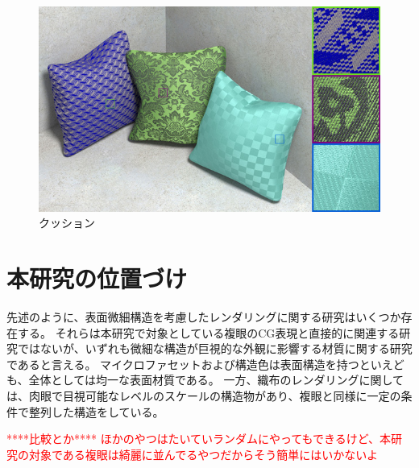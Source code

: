 \begin{figure}[htbp]
  \centering
  \includegraphics[width=5.5in]{./img/cussions.jpg}
  \caption{クッション}
  \label{F}
\end{figure}

\section{本研究の位置づけ}
\label{SPosition}

先述のように、表面微細構造を考慮したレンダリングに関する研究はいくつか存在する。
それらは本研究で対象としている複眼のCG表現と直接的に関連する研究ではないが、いずれも微細な構造が巨視的な外観に影響する材質に関する研究であると言える。
マイクロファセットおよび構造色は表面構造を持つといえども、全体としては均一な表面材質である。
一方、織布のレンダリングに関しては、肉眼で目視可能なレベルのスケールの構造物があり、複眼と同様に一定の条件で整列した構造をしている。

\textcolor{red}{****比較とか****}
\textcolor{red}{ほかのやつはたいていランダムにやってもできるけど、本研究の対象である複眼は綺麗に並んでるやつだからそう簡単にはいかないよ}
